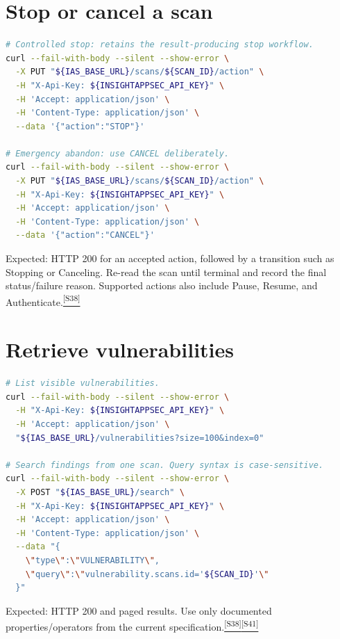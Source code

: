 \documentclass[11pt,letterpaper,oneside]{scrreprt}
\newcommand{\src}[1]{\hyperref[src:#1]{\textsuperscript{\color{R7Orange}[#1]}}}
\begin{document}
\section{Stop or cancel a scan}
\begin{lstlisting}[language=bash]
# Controlled stop: retains the result-producing stop workflow.
curl --fail-with-body --silent --show-error \
  -X PUT "${IAS_BASE_URL}/scans/${SCAN_ID}/action" \
  -H "X-Api-Key: ${INSIGHTAPPSEC_API_KEY}" \
  -H 'Accept: application/json' \
  -H 'Content-Type: application/json' \
  --data '{"action":"STOP"}'

# Emergency abandon: use CANCEL deliberately.
curl --fail-with-body --silent --show-error \
  -X PUT "${IAS_BASE_URL}/scans/${SCAN_ID}/action" \
  -H "X-Api-Key: ${INSIGHTAPPSEC_API_KEY}" \
  -H 'Accept: application/json' \
  -H 'Content-Type: application/json' \
  --data '{"action":"CANCEL"}'
\end{lstlisting}
Expected: HTTP 200 for an accepted action, followed by a transition such as Stopping or Canceling. Re-read the scan until terminal and record the final status/failure reason. Supported actions also include Pause, Resume, and Authenticate.\src{S38}

\section{Retrieve vulnerabilities}
\begin{lstlisting}[language=bash]
# List visible vulnerabilities.
curl --fail-with-body --silent --show-error \
  -H "X-Api-Key: ${INSIGHTAPPSEC_API_KEY}" \
  -H 'Accept: application/json' \
  "${IAS_BASE_URL}/vulnerabilities?size=100&index=0"

# Search findings from one scan. Query syntax is case-sensitive.
curl --fail-with-body --silent --show-error \
  -X POST "${IAS_BASE_URL}/search" \
  -H "X-Api-Key: ${INSIGHTAPPSEC_API_KEY}" \
  -H 'Accept: application/json' \
  -H 'Content-Type: application/json' \
  --data "{
    \"type\":\"VULNERABILITY\",
    \"query\":\"vulnerability.scans.id='${SCAN_ID}'\"
  }"
\end{lstlisting}
Expected: HTTP 200 and paged results. Use only documented properties/operators from the current specification.\src{S38}\src{S41}
\end{document}
